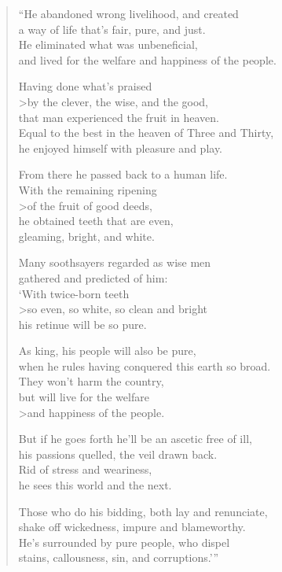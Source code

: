 \documentclass[12pt,openany]{book}%
\begin{document}
\begin{verse}%
“He abandoned wrong livelihood, and created \\
a way of life that’s fair, pure, and just. \\
He eliminated what was unbeneficial, \\
and lived for the welfare and happiness of the people. 

Having done what’s praised \\>by the clever, the wise, and the good, \\
that man experienced the fruit in heaven. \\
Equal to the best in the heaven of Three and Thirty, \\
he enjoyed himself with pleasure and play. 

From there he passed back to a human life. \\
With the remaining ripening \\>of the fruit of good deeds, \\
he obtained teeth that are even, \\
gleaming, bright, and white. 

Many soothsayers regarded as wise men \\
gathered and predicted of him: \\
‘With twice-born teeth \\>so even, so white, so clean and bright \\
his retinue will be so pure. 

As king, his people will also be pure, \\
when he rules having conquered this earth so broad. \\
They won’t harm the country, \\
but will live for the welfare \\>and happiness of the people. 

But if he goes forth he’ll be an ascetic free of ill, \\
his passions quelled, the veil drawn back. \\
Rid of stress and weariness, \\
he sees this world and the next. 

Those who do his bidding, both lay and renunciate, \\
shake off wickedness, impure and blameworthy. \\
He’s surrounded by pure people, who dispel \\
stains, callousness, sin, and corruptions.’” 

%
\end{verse}
\end{document}
